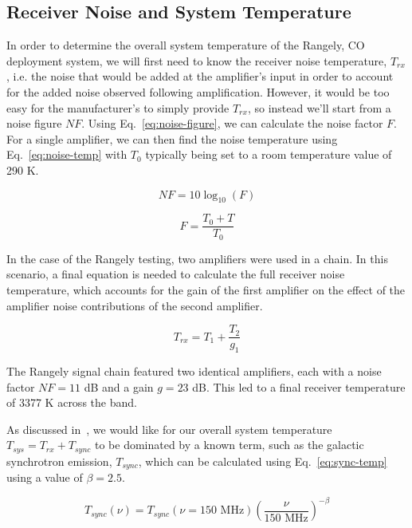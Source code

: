 \documentclass[11pt]{article}
\begin{document}
\subsection{Receiver Noise and System Temperature}

In order to determine the overall system temperature of the Rangely, CO 
deployment system, we will first need to know the receiver noise temperature, 
$T_{rx}$, i.e.  the noise that would be added at the amplifier's input in order 
to account for the added noise observed following amplification. However, it 
would be too easy for the manufacturer's to simply provide $T_{rx}$, so instead 
we'll start from a noise figure $NF$. Using Eq.~\eqref{eq:noise-figure}, we can 
calculate the noise factor $F$. For a single amplifier, we can then find the 
noise temperature using Eq.~\eqref{eq:noise-temp} with $T_0$ typically being 
set to a room temperature value of 290 K.

\begin{equation}
    \label{eq:noise-figure}
    NF = 10 \log_{10}(F)
\end{equation}

\begin{equation}
    \label{eq:noise-temp}
    F = \frac{T_0 + T}{T_0}
\end{equation}

In the case of the Rangely testing, two amplifiers were used in a chain. In 
this scenario, a final equation is needed to calculate the full receiver noise 
temperature, which accounts for the gain of the first amplifier on the effect 
of the amplifier noise contributions of the second amplifier. 

\begin{equation}
    \label{eq:receiver-temp}
    T_{rx} = T_1 + \frac{T_2}{g_1}
\end{equation}

The Rangely signal chain featured two identical amplifiers, each with a noise 
factor $NF = 11$ dB and a gain $g = 23$ dB. This led to a final receiver 
temperature of 3377 K across the band.

As discussed in~\citet{kundert2016}, we would  like for our overall system 
temperature $T_{sys} = T_{rx} + T_{sync}$ to be dominated by a known term, such 
as the galactic synchrotron emission, $T_{sync}$, which can be calculated using 
Eq.~\eqref{eq:sync-temp} using a value of $\beta = 2.5$.

\begin{equation}
    \label{eq:sync-temp}
    T_{sync}(\nu) = T_{sync}(\nu = \textrm{150 MHz}) 
    \left(\frac{\nu}{\textrm{150 MHz}}\right)^{-\beta}
\end{equation}
\end{document}
